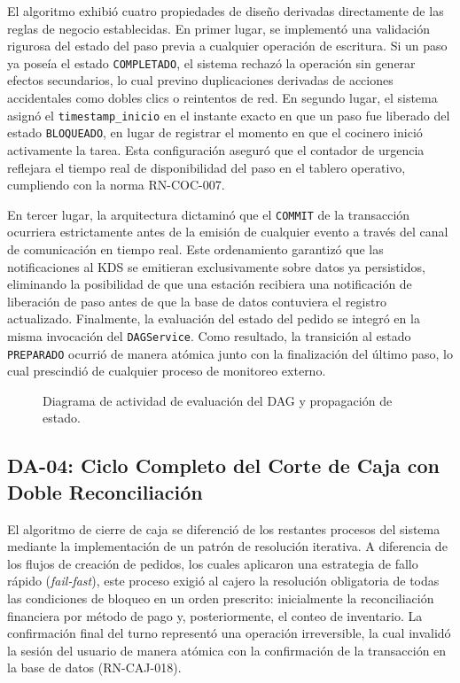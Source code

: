 El algoritmo exhibió cuatro propiedades de diseño derivadas directamente de las reglas de negocio establecidas. En primer lugar, se implementó una validación rigurosa del estado del paso previa a cualquier operación de escritura. Si un paso ya poseía el estado \texttt{COMPLETADO}, el sistema rechazó la operación sin generar efectos secundarios, lo cual previno duplicaciones derivadas de acciones accidentales como dobles clics o reintentos de red. En segundo lugar, el sistema asignó el \texttt{timestamp\_inicio} en el instante exacto en que un paso fue liberado del estado \texttt{BLOQUEADO}, en lugar de registrar el momento en que el cocinero inició activamente la tarea. Esta configuración aseguró que el contador de urgencia reflejara el tiempo real de disponibilidad del paso en el tablero operativo, cumpliendo con la norma RN-COC-007.

En tercer lugar, la arquitectura dictaminó que el \texttt{COMMIT} de la transacción ocurriera estrictamente antes de la emisión de cualquier evento a través del canal de comunicación en tiempo real. Este ordenamiento garantizó que las notificaciones al KDS se emitieran exclusivamente sobre datos ya persistidos, eliminando la posibilidad de que una estación recibiera una notificación de liberación de paso antes de que la base de datos contuviera el registro actualizado. Finalmente, la evaluación del estado del pedido se integró en la misma invocación del \texttt{DAGService}. Como resultado, la transición al estado \texttt{PREPARADO} ocurrió de manera atómica junto con la finalización del último paso, lo cual prescindió de cualquier proceso de monitoreo externo.


\begin{landscape}
\begin{figure}[H]
    \centering
    
    \caption{Diagrama de actividad de evaluación del DAG y propagación de estado.}
    \label{fig:diagrama-actividad-evaluacion-dag}
\end{figure}
\end{landscape}

\subsection{DA-04: Ciclo Completo del Corte de Caja con Doble Reconciliación}

El algoritmo de cierre de caja se diferenció de los restantes procesos del sistema mediante la implementación de un patrón de resolución iterativa. A diferencia de los flujos de creación de pedidos, los cuales aplicaron una estrategia de fallo rápido (\textit{fail-fast}), este proceso exigió al cajero la resolución obligatoria de todas las condiciones de bloqueo en un orden prescrito: inicialmente la reconciliación financiera por método de pago y, posteriormente, el conteo de inventario. La confirmación final del turno representó una operación irreversible, la cual invalidó la sesión del usuario de manera atómica con la confirmación de la transacción en la base de datos (RN-CAJ-018).

